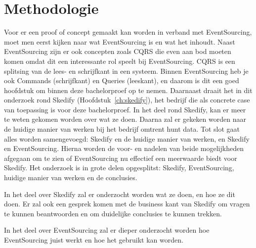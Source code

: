 
\chapter{Methodologie}
\label{ch:methodologie}



Voor er een proof of concept gemaakt kan worden in verband met EventSourcing, moet men eerst kijken naar wat EventSourcing is en wat het inhoudt. Naast EventSourcing zijn er ook concepten zoals CQRS die even aan bod moeten komen omdat dit een interessante rol speelt bij EventSourcing. CQRS is een splitsing van de lees- en schrijfkant in een systeem. Binnen EventSourcing heb je ook Commands (schrijfkant) en Queries (leeskant), en daarom is dit een goed hoofdstuk om binnen deze bachelorproef op te nemen. Daarnaast draait het in dit onderzoek rond Skedify (Hoofdstuk~\ref{ch:skedify}), het bedrijf die als concrete case van toepassing is voor deze bachelorproef. In het deel rond Skedify, kan er meer te weten gekomen worden over wat ze doen. Daarna zal er gekeken worden naar de huidige manier van werken bij het bedrijf omtrent hunt data. Tot slot gaat alles worden samengevoegd: Skedify en de huidige manier van werken, en Skedify en EventSourcing. Hierna worden de voor- en nadelen van beide mogelijkheden afgegaan om te zien of EventSourcing nu effectief een meerwaarde biedt voor Skedify. Het onderzoek is in grote delen opgesplitst: Skedify, EventSourcing, huidige manier van werken en de conclusies.

In het deel over Skedify zal er onderzocht worden wat ze doen, en hoe ze dit doen. Er zal ook een gesprek komen met de business kant van Skedify om vragen te kunnen beantwoorden en om duidelijke conclusies te kunnen trekken.

In het deel over EventSourcing zal er dieper onderzocht worden hoe EventSourcing juist werkt en hoe het gebruikt kan worden.